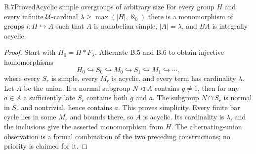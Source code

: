 \begin{claim}{B.7}{Proved}{Acyclic simple overgroups of arbitrary size}
For every group $H$ and every infinite $\mathcal U$-cardinal
$\lambda\geq\max(|H|,\aleph_0)$ there is a monomorphism of groups
$i:H\hookrightarrow A$ such that $A$ is nonabelian simple,
$|A|=\lambda$, and $BA$ is integrally acyclic.
\end{claim}
\begin{proof}
Start with $H_0=H*F_\lambda$.  Alternate B.5 and B.6 to obtain
injective homomorphisms
\[
 H_0\hookrightarrow S_0\hookrightarrow M_0\hookrightarrow
 S_1\hookrightarrow M_1\hookrightarrow\cdots,
\]
where every $S_r$ is simple, every $M_r$ is acyclic, and every term has
cardinality $\lambda$.  Let $A$ be the union.  If a normal subgroup
$N\lhd A$ contains $g\ne1$, then for any $a\in A$ a sufficiently late
$S_r$ contains both $g$ and $a$.  The subgroup $N\cap S_r$ is normal in
$S_r$ and nontrivial, hence contains $a$.  This proves simplicity.
Every finite bar cycle lies in some $M_r$ and bounds there, so $A$ is
acyclic.  Its cardinality is $\lambda$, and the inclusions give the
asserted monomorphism from $H$.  The alternating-union observation is a
formal combination of the two preceding constructions; no priority is
claimed for it.
\end{proof}

